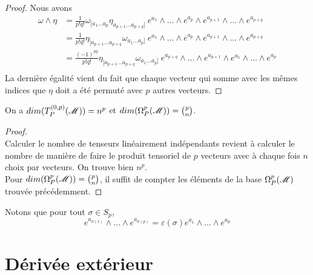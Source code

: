 \documentclass[a4paper,11pt]{report}
\begin{document}
            \begin{proof} 
                Nous avons
                \begin{align}
                    \omega\wedge\eta &= \frac{1}{p!q!}\omega_{[a_1\dots a_p}\eta_{a_{p+1}\dots a_{p+q}]}~e^{a_1}\wedge \dots\wedge e^{a_p}\wedge e^{a_{p+1}}\wedge\dots\wedge e^{a_{p+q}} \\
                    &= \frac{1}{p!q!}\eta_{[a_{p+1}\dots a_{p+q}}\omega_{a_1\dots a_p]}~e^{a_1}\wedge \dots\wedge e^{a_p}\wedge e^{a_{p+1}}\wedge\dots\wedge e^{a_{p+q}}\\
                    &= \frac{(-1)^{pq}}{p!q!}\eta_{[a_{p+1}\dots a_{p+q}}\omega_{a_1\dots a_p]}~e^{a_{p+q}}\wedge \dots\wedge e^{a_{p+1}}\wedge e^{a_1}\wedge\dots\wedge e^{a_p}\\
                \end{align}
                La dernière égalité vient du fait que chaque vecteur qui somme avec les mêmes indices que $\eta$ doit a été permuté avec $p$ autres vecteurs.
            \end{proof}
            
            \begin{prop}\begin{leftbar}
                On a $dim(T_P^{(0,p)}(\mathscr{M})) = n^p$ et $dim(\Omega_P^p(\mathscr{M})) = {p \choose n}$.
            \end{leftbar}\end{prop}
            
            \begin{proof}${}$\\
                 Calculer le nombre de tenseurs linéairement indépendants revient à calculer le nombre de manière de faire le produit tensoriel de $p$ vecteurs avec à chaque fois $n$ choix par vecteurs. On trouve bien $n^p$.\\
                 Pour $dim(\Omega_P^p(\mathscr{M})) = {p \choose n}$, il suffit de compter les éléments de la base $\Omega_P^p(\mathscr{M})$ trouvée précédemment.
            \end{proof}
            
            Notons que pour tout $\sigma\in S_p$,
            \begin{equation}
                e^{a_{\sigma(1)}}\wedge\dots\wedge e^{a_{\sigma(p)}} = \varepsilon(\sigma)e^{a_1}\wedge\dots \wedge e^{a_p}
            \end{equation}
        
        \section{Dérivée extérieur}
        
\end{document}
